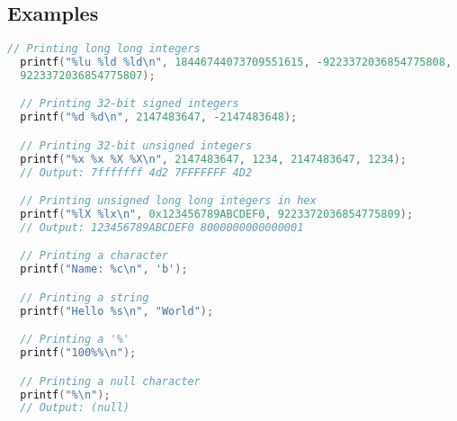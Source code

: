 \subsection*{Examples}
\begin{lstlisting}[language={C}, caption={Examples of printf usage in AstraKernel.}, label={lst:printf_examples}]
  // Printing long long integers
  printf("%lu %ld %ld\n", 18446744073709551615, -9223372036854775808, 
  9223372036854775807);

  // Printing 32-bit signed integers
  printf("%d %d\n", 2147483647, -2147483648);

  // Printing 32-bit unsigned integers
  printf("%x %x %X %X\n", 2147483647, 1234, 2147483647, 1234);
  // Output: 7fffffff 4d2 7FFFFFFF 4D2

  // Printing unsigned long long integers in hex
  printf("%lX %lx\n", 0x123456789ABCDEF0, 9223372036854775809);
  // Output: 123456789ABCDEF0 8000000000000001

  // Printing a character
  printf("Name: %c\n", 'b');

  // Printing a string
  printf("Hello %s\n", "World");

  // Printing a '%'
  printf("100%%\n");

  // Printing a null character
  printf("%\n");
  // Output: (null)
\end{lstlisting}


